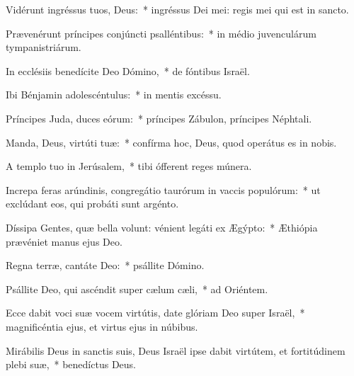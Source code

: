 
\item Vidérunt ingréssus tuos, Deus:~* ingréssus Dei mei: regis mei qui est in sancto.

\item Prævenérunt príncipes conjúncti psalléntibus:~* in médio juvenculárum tympanistriárum.

\item In ecclésiis benedícite Deo Dómino,~* de fóntibus Israël.

\item Ibi Bénjamin adolescéntulus:~* in mentis excéssu.

\item Príncipes Juda, duces eórum:~* príncipes Zábulon, príncipes Néphtali.

\item Manda, Deus, virtúti tuæ:~* confírma hoc, Deus, quod operátus es in nobis.

\item A templo tuo in Jerúsalem,~* tibi ófferent reges múnera.

\item Increpa feras arúndinis, congregátio taurórum in vaccis populórum:~* ut exclúdant eos, qui probáti sunt argénto.

\item Díssipa Gentes, quæ bella volunt: vénient legáti ex Ægýpto:~* Æthiópia prævéniet manus ejus Deo.

\item Regna terræ, cantáte Deo:~* psállite Dómino.

\item Psállite Deo, qui ascéndit super cælum cæli,~* ad Oriéntem.

\item Ecce dabit voci suæ vocem virtútis, date glóriam Deo super Israël,~* magnificéntia ejus, et virtus ejus in núbibus.

\item Mirábilis Deus in sanctis suis, Deus Israël ipse dabit virtútem, et fortitúdinem plebi suæ,~* benedíctus Deus.
